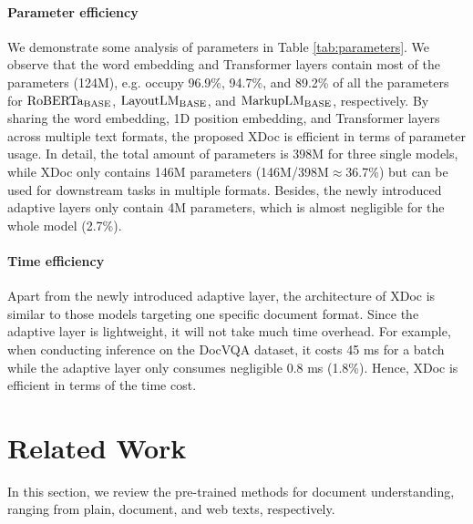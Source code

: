 \documentclass[11pt]{article}
\begin{document}
\paragraph{Parameter efficiency}
We demonstrate some analysis of parameters in Table \ref{tab:parameters}. We observe that the word embedding and Transformer layers contain most of the parameters (124M), e.g. occupy 96.9\%, 94.7\%, and 89.2\% of all the parameters for ${\rm RoBERTa_{BASE}}$, ${\rm LayoutLM_{BASE}}$, and ${\rm MarkupLM_{BASE}}$, respectively. By sharing the word embedding, 1D position embedding, and Transformer layers across multiple text formats, the proposed XDoc is efficient in terms of parameter usage. In detail, the total amount of parameters is 398M for three single models, while XDoc only contains 146M parameters (146M/398M$\approx$36.7\%) but can be used for downstream tasks in multiple formats. Besides, the newly introduced adaptive layers only contain 4M parameters, which is almost negligible for the whole model (2.7\%).

\paragraph{Time efficiency} Apart from the newly introduced adaptive layer, the architecture of XDoc is similar to those models targeting one specific document format. Since the adaptive layer is lightweight, it will not take much time overhead. For example, when conducting inference on the DocVQA dataset, it costs 45 ms for a batch while the adaptive layer only consumes negligible 0.8 ms (1.8\%). Hence, XDoc is efficient in terms of the time cost. 

\section{Related Work}
In this section, we review the pre-trained methods for document understanding, ranging from plain, document, and web texts, respectively.
\end{document}
